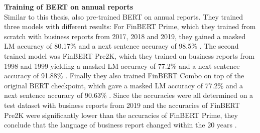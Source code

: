 \textbf{Training of \acs{BERT} on annual reports} \\
Similar to this thesis, \cite{DeSola2019} also pre-trained \acs{BERT} on annual reports.
They trained three models with different results:
For FinBERT Prime, which they trained from scratch with business reports from 2017, 2018 and 2019, they gained a masked LM accuracy of 80.17\% and a next sentence accuracy of 98.5\% \cite[pp. 6-7]{DeSola2019}.
The second trained model was FinBERT Pre2K, which they trained on business reports from 1998 and 1999 yielding a masked LM accuracy of 77.2\% and a next sentence accuracy of 91.88\% \cite[pp. 6-7]{DeSola2019}.
Finally they also trained FinBERT Combo on top of the original BERT checkpoint, which gave a masked LM accuracy of 77.2\% and a next sentence accuracy of 90.63\% \cite[pp. 6-7]{DeSola2019}.
Since the accuracies were all determined on a test dataset with business reports from 2019 and the accuracies of FinBERT Pre2K were significantly lower than the accuracies of FinBERT Prime, they conclude that the language of business report changed within the 20 years \cite[pp. 7-8]{DeSola2019}.


